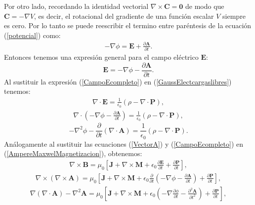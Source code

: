\documentclass[11pt,fleqn]{book} %
\begin{document}
Por otro lado, recordando la identidad vectorial $\nabla \times \textbf{C}=\textbf{0}$ de modo que $\textbf{C}=-\nabla V$, es decir, el rotacional del gradiente de una funci\'on escalar $V$ siempre es cero. Por lo tanto se puede reescribir el termino entre par\'entesis de la ecuaci\'on (\ref{potencial}) como:
\begin{eqnarray*}
-\nabla \phi=\textbf{E}+\frac{\partial \textbf{A}}{\partial t}.
\end{eqnarray*}
Entonces tenemos una expresi\'on general para el campo el\'ectrico $\textbf{E}$:
\begin{equation}
\textbf{E}=-\nabla \phi-\frac{\partial \textbf{A}}{\partial t}.  \label{CampoEcompleto}
\end{equation}
Al sustituir la expresi\'on  (\ref{CampoEcompleto}) en (\ref{GaussElectcargaslibres}) tenemos:
\begin{eqnarray*}
\nabla \cdot \textbf{E}=\frac{1}{\epsilon_{0}}\left(\rho-\nabla \cdot \textbf{P}\right),
\end{eqnarray*}
\begin{eqnarray*}
\nabla \cdot \left(-\nabla \phi-\frac{\partial \textbf{A}}{\partial t}\right) =\frac{1}{\epsilon_{0}}\left(\rho-\nabla \cdot \textbf{P}\right),
\end{eqnarray*}
\begin{equation}
-\nabla^{2}\phi -\frac{\partial}{\partial t}\left(\nabla \cdot \textbf{A}\right)  =\frac{1}{\epsilon_{0}}\left(\rho-\nabla \cdot \textbf{P}\right).  \label{EcuacionPotencial}
\end{equation}
An\'alogamente al sustituir las ecuaciones (\ref{VectorA}) y (\ref{CampoEcompleto}) en (\ref{AmpereMaxwelMagnetizacion}), obtenemos:
\begin{eqnarray*}
\nabla \times \textbf{B}=\mu_{0}\left[\textbf{J}+\nabla \times \textbf{M}+\epsilon_{0}\frac{\partial \textbf{E}}{\partial t}+\frac{\partial \textbf{P}}{\partial t} \right],
\end{eqnarray*}
\begin{eqnarray*}
\nabla \times (\nabla \times \textbf{A})=\mu_{0}\left[\textbf{J}+\nabla \times \textbf{M}+\epsilon_{0}\frac{\partial}{\partial t} \left( -\nabla \phi-\frac{\partial \textbf{A}}{\partial t} \right)  +\frac{\partial \textbf{P}}{\partial t} \right],
\end{eqnarray*}
\begin{eqnarray*}
\nabla(\nabla \cdot \textbf{A})-\nabla^{2} \textbf{A}=\mu_{0}\left[\textbf{J}+\nabla \times \textbf{M}+\epsilon_{0}\left(-\nabla\frac{\partial \phi}{\partial t}-\frac{\partial^{2} \textbf{A}}{\partial t^{2}} \right)  +\frac{\partial \textbf{P}}{\partial t} \right],
\end{eqnarray*}
\end{document}
